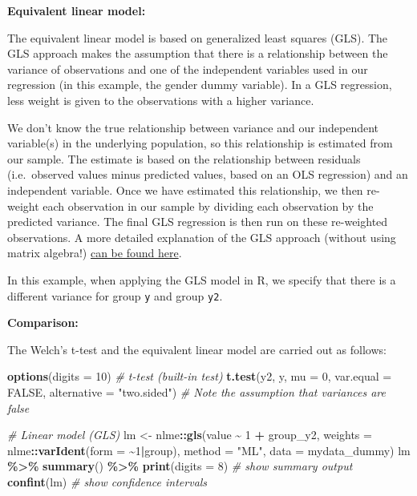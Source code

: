 \documentclass[
  12pt,
]{krantz}
\newenvironment{Shaded}{\begin{snugshade}}{\end{snugshade}}
\newcommand{\CommentTok}[1]{\textcolor[rgb]{0.56,0.35,0.01}{\textit{#1}}}
\newcommand{\DataTypeTok}[1]{\textcolor[rgb]{0.13,0.29,0.53}{#1}}
\newcommand{\DecValTok}[1]{\textcolor[rgb]{0.00,0.00,0.81}{#1}}
\newcommand{\KeywordTok}[1]{\textcolor[rgb]{0.13,0.29,0.53}{\textbf{#1}}}
\newcommand{\NormalTok}[1]{#1}
\newcommand{\OperatorTok}[1]{\textcolor[rgb]{0.81,0.36,0.00}{\textbf{#1}}}
\newcommand{\OtherTok}[1]{\textcolor[rgb]{0.56,0.35,0.01}{#1}}
\newcommand{\StringTok}[1]{\textcolor[rgb]{0.31,0.60,0.02}{#1}}
\begin{document}
\textbf{Equivalent linear model:}

The equivalent linear model is based on generalized least squares (GLS). The GLS approach makes the assumption that there is a relationship between the variance of observations and one of the independent variables used in our regression (in this example, the gender dummy variable). In a GLS regression, less weight is given to the observations with a higher variance.

We don't know the true relationship between variance and our independent variable(s) in the underlying population, so this relationship is estimated from our sample. The estimate is based on the relationship between residuals (i.e.~observed values minus predicted values, based on an OLS regression) and an independent variable. Once we have estimated this relationship, we then re-weight each observation in our sample by dividing each observation by the predicted variance. The final GLS regression is then run on these re-weighted observations. A more detailed explanation of the GLS approach (without using matrix algebra!) \href{http://www.homepages.ucl.ac.uk/~uctpsc0/Teaching/GR03/Heter\&Autocorr.pdf}{can be found here}.

In this example, when applying the GLS model in R, we specify that there is a different variance for group \texttt{y} and group \texttt{y2}.

\textbf{Comparison:}

The Welch's t-test and the equivalent linear model are carried out as follows:

\begin{Shaded}
\begin{Highlighting}[]
\KeywordTok{options}\NormalTok{(}\DataTypeTok{digits =} \DecValTok{10}\NormalTok{)}
\CommentTok{\# t{-}test (built{-}in test)}
\KeywordTok{t.test}\NormalTok{(y2, y, }\DataTypeTok{mu =} \DecValTok{0}\NormalTok{, }\DataTypeTok{var.equal =} \OtherTok{FALSE}\NormalTok{, }\DataTypeTok{alternative =} \StringTok{"two.sided"}\NormalTok{)}
\CommentTok{\# Note the assumption that variances are false}

\CommentTok{\# Linear model (GLS)}
\NormalTok{lm \textless{}{-}}\StringTok{ }\NormalTok{nlme}\OperatorTok{::}\KeywordTok{gls}\NormalTok{(value }\OperatorTok{\textasciitilde{}}\StringTok{ }\DecValTok{1} \OperatorTok{+}\StringTok{ }\NormalTok{group\_y2,}
                \DataTypeTok{weights =}\NormalTok{ nlme}\OperatorTok{::}\KeywordTok{varIdent}\NormalTok{(}\DataTypeTok{form =} \OperatorTok{\textasciitilde{}}\DecValTok{1}\OperatorTok{|}\NormalTok{group),}
                \DataTypeTok{method =} \StringTok{"ML"}\NormalTok{,}
                \DataTypeTok{data =}\NormalTok{ mydata\_dummy)}
\NormalTok{  lm }\OperatorTok{\%\textgreater{}\%}\StringTok{ }\KeywordTok{summary}\NormalTok{() }\OperatorTok{\%\textgreater{}\%}\StringTok{ }\KeywordTok{print}\NormalTok{(}\DataTypeTok{digits =} \DecValTok{8}\NormalTok{) }\CommentTok{\# show summary output}
  \KeywordTok{confint}\NormalTok{(lm) }\CommentTok{\# show confidence intervals}
\end{Highlighting}
\end{Shaded}
\end{document}
